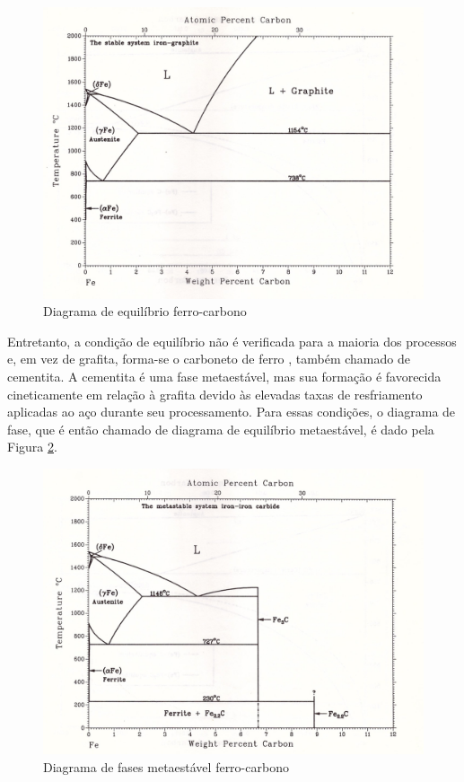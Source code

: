\documentclass[brazil,tf,epusp]{usp}  %
\begin{document}
\begin{figure}[ht!]
  \includegraphics[width=.8\textwidth,angle=180]{img/Fe-C.jpg}
  \caption{Diagrama de equilíbrio ferro-carbono \cite{Massalski1996v1}}
  \label{fig:diagrama_fe-c}
\end{figure}

Entretanto, a condição de equilíbrio não é verificada para a maioria dos processos e, em vez de grafita, forma-se o carboneto de ferro , também chamado de cementita. A cementita é uma fase metaestável, mas sua formação é favorecida cineticamente em relação à grafita devido às elevadas taxas de resfriamento aplicadas ao aço durante seu processamento.
Para essas condições, o diagrama de fase, que é então chamado de diagrama de equilíbrio metaestável, é dado pela Figura \ref{fig:diagrama_fe-c_meta}.

\begin{figure}[ht!]
  \includegraphics[width=.8\textwidth,angle=180]{img/Fe-C_meta.jpg}
  \caption{Diagrama de fases metaestável ferro-carbono \cite{Massalski1996v1}}
  \label{fig:diagrama_fe-c_meta}
\end{figure}
\end{document}
